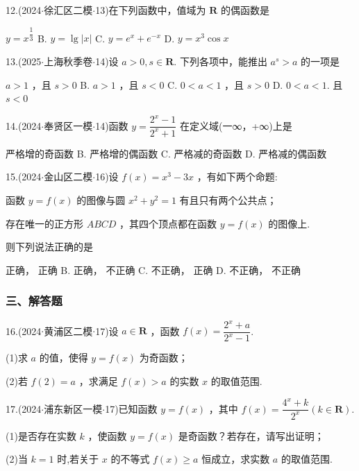 12.(2024$\cdot$徐汇区二模$\cdot$13)在下列函数中，值域为 $\mathbf{R}$ 的偶函数是 \dotfill{(\kh{})}

\xx{}{}{}{}$y = {x}^{\dfrac{1}{3}}$ B. $y = \lg \left| x\right|$ C. $y = {{e}}^{x} + {{e}}^{-x}$ D. $y = {x}^{3}\cos x$

13.(2025$\cdot$上海秋季卷$\cdot$14)设 $a > 0,s \in  \mathbf{R}$. 下列各项中，能推出 ${a}^{s} > a$ 的一项是 \dotfill{(\kh{})}

\xx{}{}{}{}$a > 1$ ，且 $s > 0$ B. $a > 1$ ，且 $s < 0$ C. $0 < a < 1$ ，且 $s > 0$ D. $0 < a < 1$. 且 $s < 0$

14.(2024$\cdot$奉贤区一模$\cdot$14)函数 $y = \dfrac{{2}^{x} - 1}{{2}^{x} + 1}$ 在定义域(一∞，+∞)上是 \dotfill{(\kh{})}

\xx{}{}{}{}严格增的奇函数 B. 严格增的偶函数 C. 严格减的奇函数 D. 严格减的偶函数

15.(2024$\cdot$金山区二模$\cdot$16)设 $f\left( x\right)  = {x}^{3} - {3x}$ ，有如下两个命题:

   函数 $y = f\left( x\right)$ 的图像与圆 ${x}^{2} + {y}^{2} = 1$ 有且只有两个公共点；

   存在唯一的正方形 ${ABCD}$ ，其四个顶点都在函数 $y = f\left( x\right)$ 的图像上.

则下列说法正确的是 \dotfill{(\kh{})}

\xx{}{}{}{}  正确，  正确 B.   正确，  不正确 C.   不正确，  正确 D.   不正确，  不正确

\subsubsection*{三、解答题}

16.(2024$\cdot$黄浦区二模$\cdot$17)设 $a \in  \mathbf{R}$ ，函数 $f\left( x\right)  = \dfrac{{2}^{x} + a}{{2}^{x} - 1}$.

(1)求 $a$ 的值，使得 $y = f\left( x\right)$ 为奇函数；

(2)若 $f\left( 2\right)  = a$ ，求满足 $f\left( x\right)  > a$ 的实数 $x$ 的取值范围.

17.(2024$\cdot$浦东新区一模$\cdot$17)已知函数 $y = f\left( x\right)$ ，其中 $f\left( x\right)  = \dfrac{{4}^{x} + k}{{2}^{x}}\left( {k \in  \mathbf{R}}\right)$.

(1)是否存在实数 $k$ ，使函数 $y = f\left( x\right)$ 是奇函数？若存在，请写出证明；

(2)当 $k = 1$ 时,若关于 $x$ 的不等式 $f\left( x\right)  \geq  a$ 恒成立，求实数 $a$ 的取值范围.


